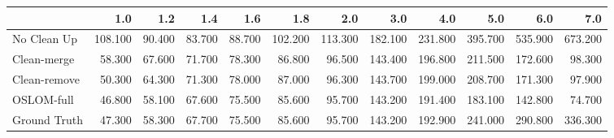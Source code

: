 \begin{tabular}{lrrrrrrrrrrr}
\toprule
{} &     1.0 &    1.2 &    1.4 &    1.6 &     1.8 &     2.0 &     3.0 &     4.0 &     5.0 &     6.0 &     7.0 \\
\midrule
No Clean Up  & 108.100 & 90.400 & 83.700 & 88.700 & 102.200 & 113.300 & 182.100 & 231.800 & 395.700 & 535.900 & 673.200 \\
Clean-merge  &  58.300 & 67.600 & 71.700 & 78.300 &  86.800 &  96.500 & 143.400 & 196.800 & 211.500 & 172.600 &  98.300 \\
Clean-remove &  50.300 & 64.300 & 71.300 & 78.000 &  87.000 &  96.300 & 143.700 & 199.000 & 208.700 & 171.300 &  97.900 \\
OSLOM-full   &  46.800 & 58.100 & 67.600 & 75.500 &  85.600 &  95.700 & 143.200 & 191.400 & 183.100 & 142.800 &  74.700 \\
Ground Truth &  47.300 & 58.300 & 67.700 & 75.500 &  85.600 &  95.700 & 143.200 & 192.900 & 241.000 & 290.800 & 336.300 \\
\bottomrule
\end{tabular}
